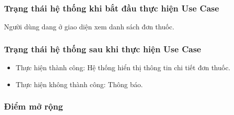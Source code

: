 \subsubsection{Trạng thái hệ thống khi bắt đầu thực hiện Use Case}
Người dùng dang ở giao diện xem danh sách đơn thuốc.

\subsubsection{Trạng thái hệ thống sau khi thực hiện Use Case}
\begin{itemize}
  \item Thực hiện thành công: Hệ thống hiển thị thông tin chi tiết đơn thuốc.
  \item Thực hiện không thành công: Thông báo.
\end{itemize}

\subsubsection{Điểm mở rộng}